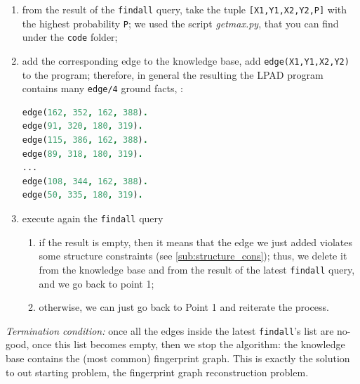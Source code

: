 \documentclass[8pt]{article}
\begin{document}
  \begin{enumerate}
    \item
      from the result of the \texttt{findall} query, take the tuple
      \texttt{[X1,Y1,X2,Y2,P]} with the highest probability \texttt{P};
      we used the script \emph{getmax.py}, that you can find under the
      \texttt{code} folder;
    \item
      add the corresponding edge to the knowledge base, \ie add
      \texttt{edge(X1,Y1,X2,Y2)} to the program; therefore, in general the
      resulting the LPAD program contains many \texttt{edge/4} ground facts,
      \eg:
  \begin{center}
  \begin{lstlisting}[language=Prolog,frame = single,basicstyle=\footnotesize\ttfamily]
edge(162, 352, 162, 388).
edge(91, 320, 180, 319).
edge(115, 386, 162, 388).
edge(89, 318, 180, 319).
...
edge(108, 344, 162, 388).
edge(50, 335, 180, 319).
  \end{lstlisting}
  \end{center}

    \item
      execute again the \texttt{findall} query
      \begin{enumerate}
        \item
          if the result is empty, then it means that the edge we just
          added violates some structure constraints (see
          \cref{sub:structure_cons}); thus, we delete it from the knowledge
          base and from the result of the latest \texttt{findall} query, and we
          go back to point 1; 
        \item
          otherwise, we can just go back to Point 1 and reiterate the process.
      \end{enumerate}
  \end{enumerate}
\emph{Termination condition:} once all the edges inside the latest
\texttt{findall}'s list are no-good, \ie once this list becomes empty, then we
stop the algorithm: the knowledge base contains the (most common) fingerprint
graph. This is exactly the solution to out starting problem, \ie the
fingerprint graph reconstruction problem.
\end{document}
